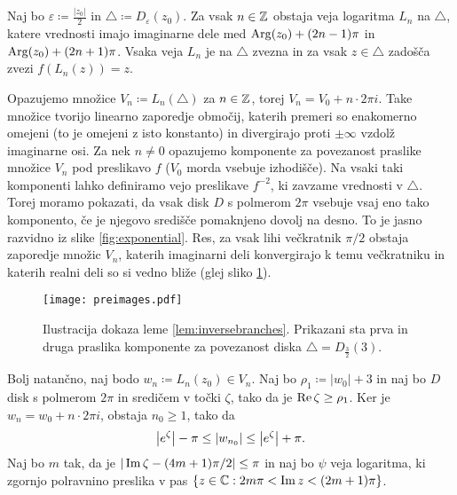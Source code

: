 \begin{dokaz}
    Naj bo \(\varepsilon \coloneq \frac{|z_0|}{2}\) in \(\triangle \coloneq D_{\varepsilon} (z_0)\). Za vsak \(n \in \mathbb Z\) obstaja veja logaritma \(L_n\) na \(\triangle\), katere vrednosti imajo imaginarne dele med \(\operatorname{Arg} (z_0) + (2 n - 1) \pi\) in \(\operatorname{Arg} (z_0) + (2 n + 1) \pi\). Vsaka veja \(L_n\) je na \(\triangle\) zvezna in za vsak \(z \in \triangle\) zadošča zvezi \(f (L_n (z)) = z\).

    Opazujemo množice \(V_n \coloneq L_n (\triangle)\) za \(n \in \mathbb Z\), torej \(V_n = V_0 + n \cdot 2 \pi i\). Take množice tvorijo linearno zaporedje območij, katerih premeri so enakomerno omejeni (to je omejeni z isto konstanto) in divergirajo proti \(\pm \infty\) vzdolž imaginarne osi. Za nek \(n \neq 0\) opazujemo komponente za povezanost praslike množice \(V_n\) pod preslikavo \(f\) (\(V_0\) morda vsebuje izhodišče). Na vsaki taki komponenti lahko definiramo vejo preslikave \(f^{-2}\), ki zavzame vrednosti v \(\triangle\). Torej moramo pokazati, da vsak disk \(D\) s polmerom \(2 \pi\) vsebuje vsaj eno tako komponento, če je njegovo središče pomaknjeno dovolj na desno. To je jasno razvidno iz slike \ref{fig:exponential}. Res, za vsak lihi večkratnik \(\pi / 2\) obstaja zaporedje množic \(V_n\), katerih imaginarni deli konvergirajo k temu večkratniku in katerih realni deli so si vedno bliže (glej sliko \ref{fig:preimages}).
    \begin{figure}
        \centering
        \texttt{[image: preimages.pdf]}
        \caption[]{Ilustracija dokaza leme \ref{lem:inversebranches}. Prikazani sta prva in druga praslika komponente za povezanost diska \(\triangle = D_{\frac{3}{2}} (3)\).}
        \label{fig:preimages}
    \end{figure}

    Bolj natančno, naj bodo \(w_n \coloneq L_n (z_0) \in V_n\). Naj bo \(\rho_1 \coloneq |w_0| + 3\) in naj bo \(D\) disk s polmerom \(2 \pi\) in sredičem v točki \(\zeta\), tako da je \(\operatorname{Re} \zeta \geq \rho_1\). Ker je \(w_n = w_0 + n \cdot 2 \pi i\), obstaja \(n_0 \geq 1\), tako da
    \begin{equation} \label{eqn:zest}
        \left\lvert e^{\zeta}\right\rvert - \pi \leq \left\lvert w_{n_0}\right\rvert \leq \left\lvert e^{\zeta}\right\rvert + \pi.
    \end{equation}
    Naj bo \(m\) tak, da je \(|\operatorname{Im} \zeta - (4 m + 1) \pi / 2| \leq \pi\) in naj bo \(\psi\) veja logaritma, ki zgornjo polravnino preslika v pas \(\left\{ z \in \mathbb C : 2 m \pi < \operatorname{Im} z < (2 m + 1) \pi \right\}\).


\end{dokaz}
